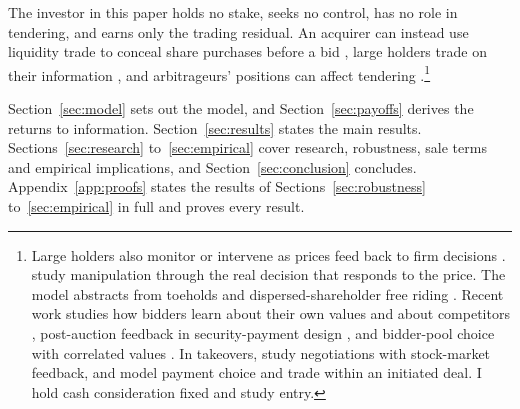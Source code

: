 The investor in this paper holds no stake, seeks no control, has no role in tendering, and earns only the trading
residual. An acquirer can instead use liquidity trade to conceal share purchases before a bid \citep{KyleVila1991},
large holders trade on their information \citep{Edmans2009}, and arbitrageurs' positions can affect tendering
\citep{CornelliLi2002}.\footnote{Large holders also monitor or intervene as prices feed back to firm decisions
\citetext{\citealp[Section~II.E]{EdmansGoldsteinJiang2015}; \citealp{Maug1998}; \citealp{BackEtAl2018}}.
\citet{GoldsteinGuembel2008} study manipulation through the real decision that responds to the price. The model
abstracts from toeholds and dispersed-shareholder free riding \citep{BulowHuangKlemperer1999,GrossmanHart1980}.
Recent work studies how bidders learn about their own values and about competitors \citep{PernoudGleyze2026},
post-auction feedback in security-payment design \citep{LiuBernhardt2022}, and bidder-pool choice with correlated
values \citep{CarlinEtAl2026}. In takeovers, \citet{BettonEtAl2014} study negotiations with stock-market feedback,
and \citet{LinMaYangZhu2025} model payment choice and trade within an initiated deal. I hold cash consideration fixed
and study entry.}

Section~\ref{sec:model} sets out the model, and Section~\ref{sec:payoffs} derives the returns to information.
Section~\ref{sec:results} states the main results. Sections~\ref{sec:research} to~\ref{sec:empirical} cover research,
robustness, sale terms and empirical implications, and Section~\ref{sec:conclusion} concludes.
Appendix~\ref{app:proofs} states the results of Sections~\ref{sec:robustness} to~\ref{sec:empirical} in full and
proves every result.
